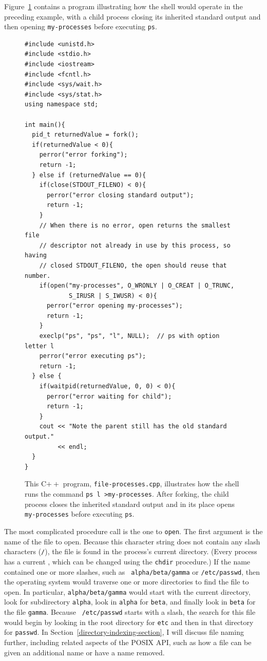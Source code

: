 Figure~\ref{file-processes-source} contains a program illustrating how
the shell would operate in the preceding example, with a child process
closing its inherited standard output and then opening \verb|my-processes| before executing \verb|ps|.
\begin{figure}
\begin{verbatim}
#include <unistd.h>
#include <stdio.h>
#include <iostream>
#include <fcntl.h>
#include <sys/wait.h>
#include <sys/stat.h>
using namespace std;

int main(){
  pid_t returnedValue = fork();
  if(returnedValue < 0){
    perror("error forking");
    return -1;
  } else if (returnedValue == 0){
    if(close(STDOUT_FILENO) < 0){
      perror("error closing standard output");
      return -1;
    }
    // When there is no error, open returns the smallest file
    // descriptor not already in use by this process, so having
    // closed STDOUT_FILENO, the open should reuse that number.
    if(open("my-processes", O_WRONLY | O_CREAT | O_TRUNC,
            S_IRUSR | S_IWUSR) < 0){
      perror("error opening my-processes");
      return -1;
    }
    execlp("ps", "ps", "l", NULL);  // ps with option letter l
    perror("error executing ps");
    return -1;
  } else {
    if(waitpid(returnedValue, 0, 0) < 0){
      perror("error waiting for child");
      return -1;
    }
    cout << "Note the parent still has the old standard output."
         << endl;
  }
}
\end{verbatim}
\caption{This C$++$ program, {\tt file-processes.cpp}, illustrates how
  the shell runs the command {\tt ps l >my-processes}.  After
  forking, the child process closes the inherited standard output and
  in its place opens {\tt my-processes} before executing {\tt ps}.}
\label{file-processes-source}
\end{figure}
The most complicated procedure call is the one to \verb|open|.  The
first argument is the name of the file to open.  Because this
character string does not contain any slash characters ({\tt /}), the
file is found in the process's current directory.  (Every process has a
current , which can be changed using the \verb|chdir|
procedure.)  If the name contained one or more slashes, such as {\tt
alpha/beta/gamma} or {\tt /etc/passwd}, then the operating system would
traverse one or more directories to find the file to open.  In particular,
{\tt alpha/beta/gamma} would start with the current directory, look for
subdirectory {\tt alpha}, look in {\tt alpha} for {\tt beta},
and finally look in {\tt beta} for the file {\tt gamma}.  Because {\tt
/etc/passwd} starts with a slash, the search for this file would begin
by looking in the root directory for {\tt etc} and then in that directory
for {\tt passwd}. In
Section~\ref{directory-indexing-section}, I will discuss file naming
further, including related aspects of the POSIX API, such as how a
file can be given an additional name or have a name removed.

